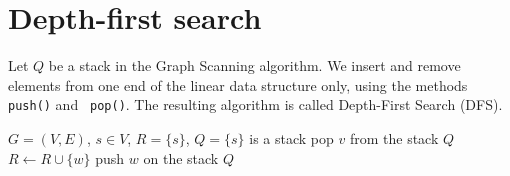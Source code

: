 \documentclass[a4paper]{book}
\theoremstyle{changebreak}                %
\begin{document}
\section{Depth-first search}
\label{s:graphalg:dfs}
Let $Q$ be a stack in the {\sc Graph
  Scanning} algorithm. We
insert and remove elements from one end of the linear data structure
only, using the methods {\tt push()} and {\tt
  pop()}. The resulting algorithm is called {\sc
  Depth-First Search} (DFS).
\begin{algorithmic}[1]
\REQUIRE $G=(V,E)$, $s\in V$, $R=\{s\}$, $Q=\{s\}$ is a
stack
 \label{dfs1}
  \STATE pop $v$ from the stack $Q$ \label{dfs2} 
   \label{dfs5}
    \STATE $R\leftarrow R\cup\{w\}$ \label{dfs7}
    \STATE push $w$ on the stack $Q$ \label{dfs8}
  \ENDFOR
\ENDWHILE
\end{algorithmic}
\end{document}
